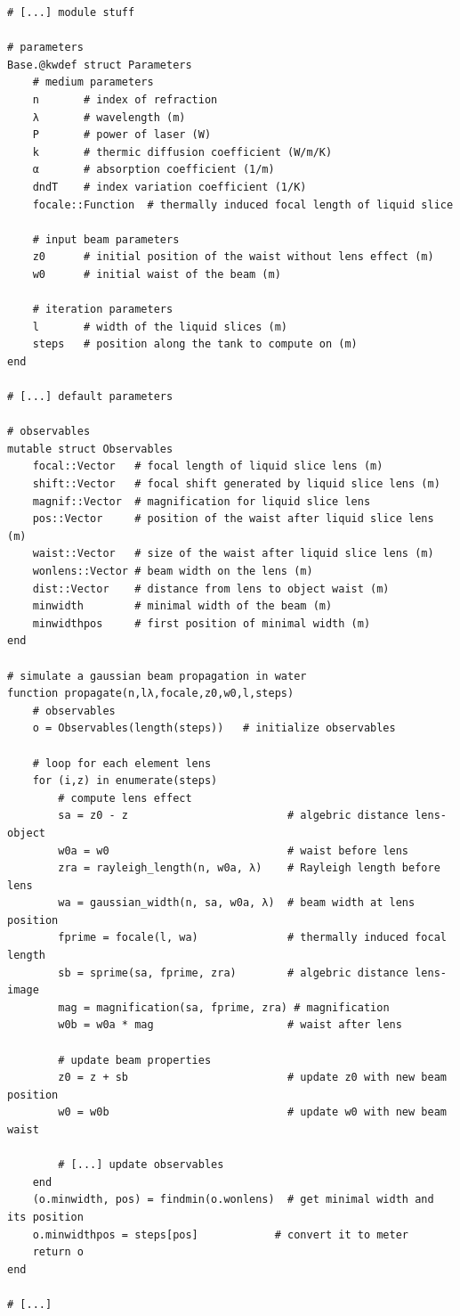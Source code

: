 \juliastyle
\begin{lstlisting}
# [...] module stuff

# parameters
Base.@kwdef struct Parameters
    # medium parameters
    n       # index of refraction
    λ       # wavelength (m)
    P       # power of laser (W)
    k       # thermic diffusion coefficient (W/m/K)
    α       # absorption coefficient (1/m)
    dndT    # index variation coefficient (1/K)
    focale::Function  # thermally induced focal length of liquid slice

    # input beam parameters    
    z0      # initial position of the waist without lens effect (m)
    w0      # initial waist of the beam (m)
    
    # iteration parameters
    l       # width of the liquid slices (m)
    steps   # position along the tank to compute on (m)
end

# [...] default parameters
   
# observables
mutable struct Observables
    focal::Vector   # focal length of liquid slice lens (m)
    shift::Vector   # focal shift generated by liquid slice lens (m)
    magnif::Vector  # magnification for liquid slice lens 
    pos::Vector     # position of the waist after liquid slice lens (m)
    waist::Vector   # size of the waist after liquid slice lens (m)
    wonlens::Vector # beam width on the lens (m)
    dist::Vector    # distance from lens to object waist (m)
    minwidth        # minimal width of the beam (m)
    minwidthpos     # first position of minimal width (m)
end

# simulate a gaussian beam propagation in water
function propagate(n,lλ,focale,z0,w0,l,steps)
    # observables
    o = Observables(length(steps))   # initialize observables

    # loop for each element lens
    for (i,z) in enumerate(steps)        
        # compute lens effect
        sa = z0 - z                         # algebric distance lens-object
        w0a = w0                            # waist before lens
        zra = rayleigh_length(n, w0a, λ)    # Rayleigh length before lens
        wa = gaussian_width(n, sa, w0a, λ)  # beam width at lens position
        fprime = focale(l, wa)              # thermally induced focal length
        sb = sprime(sa, fprime, zra)        # algebric distance lens-image
        mag = magnification(sa, fprime, zra) # magnification
        w0b = w0a * mag                     # waist after lens

        # update beam properties
        z0 = z + sb                         # update z0 with new beam position
        w0 = w0b                            # update w0 with new beam waist

        # [...] update observables
    end
    (o.minwidth, pos) = findmin(o.wonlens)  # get minimal width and its position
    o.minwidthpos = steps[pos]            # convert it to meter
    return o
end

# [...]
\end{lstlisting}

